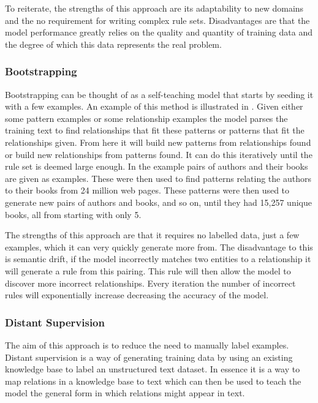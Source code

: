 \documentclass[11pt,oneside]{book}
\begin{document}
To reiterate, the strengths of this approach are its adaptability to new domains and the no requirement for writing complex rule sets. Disadvantages are that the model performance greatly relies on the quality and quantity of training data and the degree of which this data represents the real problem.

\subsubsection{Bootstrapping}
Bootstrapping can be thought of as a self-teaching model that starts by seeding it with a few examples. An example of this method is illustrated in \citet{dipre_bootstrapping}. Given either some pattern examples or some relationship examples the model parses the training text to find relationships that fit these patterns or patterns that fit the relationships given. From here it will build new patterns from relationships found or build new relationships from patterns found. It can do this iteratively until the rule set is deemed large enough. In the \citet{dipre_bootstrapping} example pairs of authors and their books are given as examples. These were then used to find patterns relating the authors to their books from 24 million web pages. These patterns were then used to generate new pairs of authors and books, and so on, until they had 15,257 unique books, all from starting with only 5.

The strengths of this approach are that it requires no labelled data, just a few examples, which it can very quickly generate more from. The disadvantage to this is semantic drift, if the model incorrectly matches two entities to a relationship it will generate a rule from this pairing. This rule will then allow the model to discover more incorrect relationships. Every iteration the number of incorrect rules will exponentially increase decreasing the accuracy of the model.

\subsubsection{Distant Supervision}

The aim of this approach is to reduce the need to manually label examples. Distant supervision is a way of generating training data by using an existing knowledge base to label an unstructured text dataset. In essence it is a way to map relations in a knowledge base to text which can then be used to teach the model the general form in which relations might appear in text.
\end{document}
